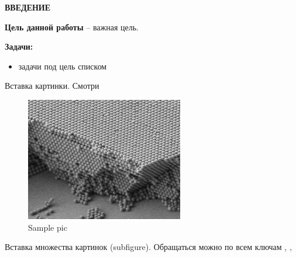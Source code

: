 \documentclass[../template.tex]{subfiles}
\begin{document}
	\begin{center}
		\normalsize\bfseries\MakeUppercase{ВВЕДЕНИЕ}
	\end{center}

	
\textbf{Цель данной работы} -- важная цель.

\textbf{Задачи:}
\begin{itemize}
	\item задачи под цель списком
\end{itemize}
	
\cite{kuchyanovLazernayaGeneraciyaOpalopodobnyh2016} %

Вставка картинки. Смотри 

\begin{figure}[h]
	\centering
	\includegraphics[width=0.5\linewidth]{../images/sample_pic.png}
	\caption{Sample pic}
	\label{fig:sample_pic}
\end{figure}

Вставка множества картинок (subfigure). Обращаться можно по всем ключам , , 
\end{document}
